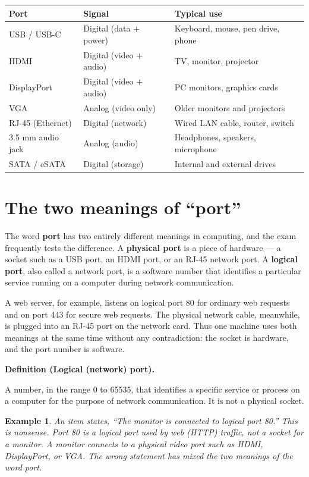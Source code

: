 \documentclass[11pt]{article}
\newtheorem{example}{Example}[section]
\newenvironment{definitionbox}[1]{%
  \par\noindent\textbf{Definition (#1).}\ \itshape
}{\par\vspace{0.3em}}
\begin{document}
\begin{center}
\begin{tabular}{p{}p{}p{}}
\toprule
\textbf{Port} & \textbf{Signal} & \textbf{Typical use} \\
\midrule
USB / USB-C & Digital (data + power) & Keyboard, mouse, pen drive, phone \\
HDMI & Digital (video + audio) & TV, monitor, projector \\
DisplayPort & Digital (video + audio) & PC monitors, graphics cards \\
VGA & Analog (video only) & Older monitors and projectors \\
RJ-45 (Ethernet) & Digital (network) & Wired LAN cable, router, switch \\
3.5 mm audio jack & Analog (audio) & Headphones, speakers, microphone \\
SATA / eSATA & Digital (storage) & Internal and external drives \\
\bottomrule
\end{tabular}
\end{center}

\section{The two meanings of ``port''}
The word \textbf{port} has two entirely different meanings in computing, and
the exam frequently tests the difference. A \textbf{physical port} is a piece
of hardware --- a socket such as a USB port, an HDMI port, or an RJ-45
network port. A \textbf{logical port}, also called a network port, is a
software number that identifies a particular service running on a computer
during network communication.

A web server, for example, listens on logical port 80 for ordinary web
requests and on port 443 for secure web requests. The physical network cable,
meanwhile, is plugged into an RJ-45 port on the network card. Thus one
machine uses both meanings at the same time without any contradiction: the
socket is hardware, and the port number is software.

\begin{definitionbox}{Logical (network) port}
A number, in the range 0 to 65535, that identifies a specific service or
process on a computer for the purpose of network communication. It is not a
physical socket.
\end{definitionbox}

\begin{example}
An item states, ``The monitor is connected to logical port 80.'' This is
nonsense. Port 80 is a logical port used by web (HTTP) traffic, not a socket
for a monitor. A monitor connects to a physical video port such as HDMI,
DisplayPort, or VGA. The wrong statement has mixed the two meanings of the
word \emph{port}.
\end{example}
\end{document}
